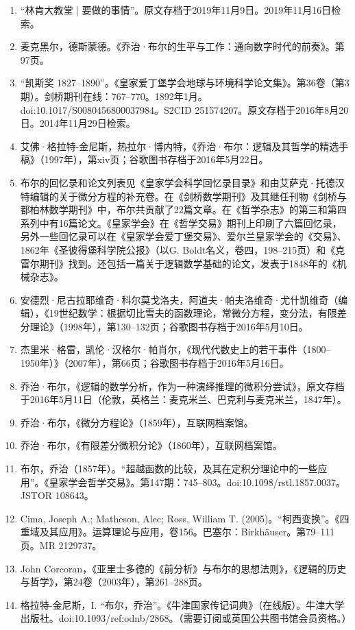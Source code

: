 \begin{enumerate}
\item “林肯大教堂 | 要做的事情”。原文存档于2019年11月9日。2019年11月16日检索。
\item 麦克黑尔，德斯蒙德。《乔治·布尔的生平与工作：通向数字时代的前奏》。第97页。
\item “凯斯奖 1827–1890”。《皇家爱丁堡学会地球与环境科学论文集》。第36卷（第3期）。剑桥期刊在线：767–770。1892年1月。doi:10.1017/S0080456800037984。S2CID 251574207。原文存档于2016年8月20日。2014年11月29日检索。
\item 艾佛·格拉特-金尼斯，热拉尔·博内特，《乔治·布尔：逻辑及其哲学的精选手稿》（1997年），第xiv页；谷歌图书存档于2016年5月22日。
\item 布尔的回忆录和论文列表见《皇家学会科学回忆录目录》和由艾萨克·托德汉特编辑的关于微分方程的补充卷。在《剑桥数学期刊》及其继任刊物《剑桥与都柏林数学期刊》中，布尔共贡献了22篇文章。在《哲学杂志》的第三和第四系列中有16篇论文。《皇家学会》在《哲学交易》期刊上印刷了六篇回忆录，另外一些回忆录可以在《皇家学会爱丁堡交易》、爱尔兰皇家学会的《交易》、1862年《圣彼得堡科学院公报》（以G. Boldt名义，卷四，198–215页）和《克雷尔期刊》找到。还包括一篇关于逻辑数学基础的论文，发表于1848年的《机械杂志》。
\item 安德烈·尼古拉耶维奇·科尔莫戈洛夫，阿道夫·帕夫洛维奇·尤什凯维奇（编辑），《19世纪数学：根据切比雪夫的函数理论，常微分方程，变分法，有限差分理论》（1998年），第130–132页；谷歌图书存档于2016年5月10日。
\item 杰里米·格雷，凯伦·汉格尔·帕肖尔，《现代代数史上的若干事件（1800–1950年）》（2007年），第66页；谷歌图书存档于2016年5月16日。
\item 乔治·布尔，《逻辑的数学分析，作为一种演绎推理的微积分尝试》，原文存档于2016年5月11日（伦敦，英格兰：麦克米兰、巴克利与麦克米兰，1847年）。
\item 乔治·布尔，《微分方程论》（1859年），互联网档案馆。
\item 乔治·布尔，《有限差分微积分论》（1860年），互联网档案馆。
\item 布尔，乔治（1857年）。“超越函数的比较，及其在定积分理论中的一些应用”。《皇家学会哲学交易》。第147期：745–803。doi:10.1098/rstl.1857.0037。JSTOR 108643。
\item Cima, Joseph A.; Matheson, Alec; Ross, William T. (2005)。“柯西变换”。《四重域及其应用》。运算理论与应用，卷156。巴塞尔：Birkhäuser。第79–111页。MR 2129737。
\item John Corcoran，《亚里士多德的《前分析》与布尔的思想法则》，《逻辑的历史与哲学》，第24卷（2003年），第261–288页。
\item 格拉特-金尼斯，I. “布尔，乔治”。《牛津国家传记词典》（在线版）。牛津大学出版社。doi:10.1093/ref:odnb/2868。（需要订阅或英国公共图书馆会员资格。）

\end{enumerate}
